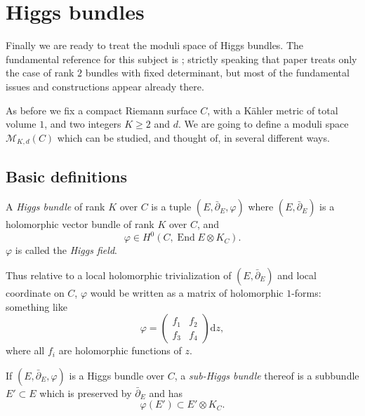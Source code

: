 \documentclass[12pt,letterpaper,reqno]{article}
\numberwithin{equation}{section}
\newcommand{\cM}{\ensuremath{\mathcal M}}
\newcommand{\kahler}{K\"ahler\xspace}
\newcommand{\de}{\mathrm{d}}
\newcommand{\ti}[1]{\textit{#1}}
\DeclareMathOperator{\End}{End}
\begin{document}
\section{Higgs bundles}

Finally we are ready to treat the moduli space of Higgs bundles.
The fundamental reference for this subject is \cite{MR89a:32021};
strictly speaking that paper treats only the case of rank $2$ bundles
with fixed determinant, but most of the fundamental issues 
and constructions appear already there.

As before we fix a compact Riemann surface $C$, with a 
\kahler metric of total volume $1$, and two integers
$K \ge 2$ and $d$.
We are going to define a moduli space $\cM_{K,d}(C)$ which can be
studied, and thought of, in several different ways.


\subsection{Basic definitions}

\begin{defn} \label{def:higgs-bundle}
A \ti{Higgs bundle} of rank $K$ over $C$ 
is a tuple $(E, \bar\partial_E, \varphi)$
where $(E,\bar\partial_E)$ is a holomorphic vector bundle
of rank $K$ over $C$, and 
\begin{equation}
\varphi \in H^0(C, \End E \otimes K_C).  
\end{equation}
$\varphi$ is called the \ti{Higgs field}.
\end{defn}

Thus relative to a local holomorphic trivialization of $(E,\bar\partial_E)$ 
and local coordinate on $C$, $\varphi$ would 
be written as a matrix of holomorphic $1$-forms: something like
\begin{equation}
  \varphi = \begin{pmatrix} f_1 & f_2 \\ f_3 & f_4 \end{pmatrix} \de z,
\end{equation}
where all $f_i$ are holomorphic functions of $z$.

\begin{defn} If $(E, \bar\partial_E, \varphi)$ 
is a Higgs bundle over $C$, a \ti{sub-Higgs bundle} thereof
is a subbundle $E' \subset E$ which is preserved by $\bar\partial_E$
and has
\begin{equation}
  \varphi(E') \subset E' \otimes K_C.
\end{equation}
\end{defn}
\end{document}

